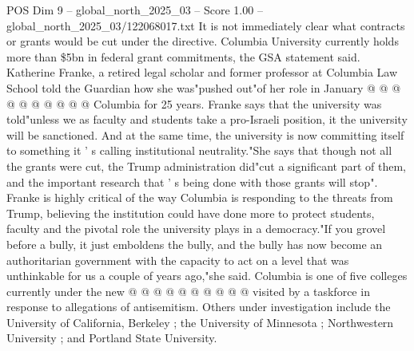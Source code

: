 \begin{textsample}{POS Dim 9 – global\_north\_2025\_03 – Score 1.00 – global\_north\_2025\_03/122068017.txt}
It is not immediately clear what contracts or grants would be cut under the directive.
Columbia University currently holds more than \$5bn in federal grant commitments, the GSA statement said.
Katherine Franke, a retired legal scholar and former professor at Columbia Law School told the Guardian how she was"pushed out"of her role in January @ @ @ @ @ @ @ @ @ @ Columbia for 25 years.
Franke says that the university was told"unless we as faculty and students take a pro-Israeli position, it the university will be sanctioned.
And at the same time, the university is now committing itself to something it ' s calling institutional neutrality."She says that though not all the grants were cut, the Trump administration did"cut a significant part of them, and the important research that ' s being done with those grants will stop".
Franke is highly critical of the way Columbia is responding to the threats from Trump, believing the institution could have done more to protect students, faculty and the pivotal role the university plays in a democracy."If you grovel before a bully, it just emboldens the bully, and the bully has now become an authoritarian government with the capacity to act on a level that was unthinkable for us a couple of years ago,"she said.
Columbia is one of five colleges currently under the new @ @ @ @ @ @ @ @ @ @ visited by a taskforce in response to allegations of antisemitism.
Others under investigation include the University of California, Berkeley ; the University of Minnesota ; Northwestern University ; and Portland State University.

\end{textsample}
